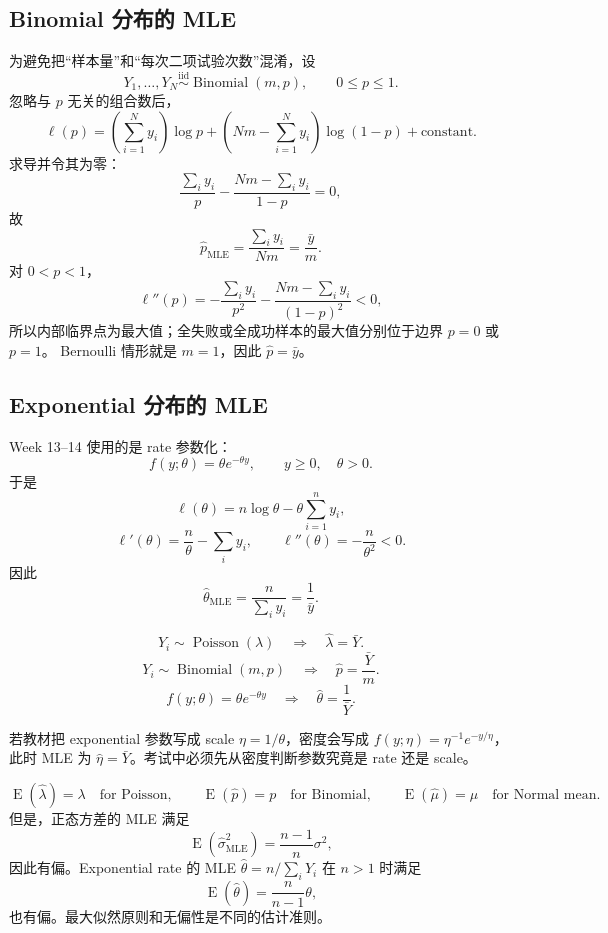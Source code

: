\documentclass[11pt,a4paper]{article}
\theoremstyle{definition}
\theoremstyle{plain}
\theoremstyle{remark}
\newcommand{\E}{\operatorname{E}}
\begin{document}
\subsection{Binomial 分布的 MLE}

为避免把“样本量”和“每次二项试验次数”混淆，设
\[
    Y_1,\ldots,Y_N\overset{\mathrm{iid}}{\sim}\operatorname{Binomial}(m,p),
    \qquad 0\le p\le 1.
\]
忽略与 $p$ 无关的组合数后，
\[
    \ell(p)
    =
    \left(\sum_{i=1}^N y_i\right)\log p
    +
    \left(Nm-\sum_{i=1}^N y_i\right)\log(1-p)
    +\text{constant}.
\]
求导并令其为零：
\[
    \frac{\sum_i y_i}{p}
    -
    \frac{Nm-\sum_i y_i}{1-p}
    =0,
\]
故
\[
    \hat p_{\mathrm{MLE}}
    =
    \frac{\sum_i y_i}{Nm}
    =
    \frac{\bar y}{m}.
\]
对 $0<p<1$，
\[
    \ell''(p)
    =
    -\frac{\sum_i y_i}{p^2}
    -
    \frac{Nm-\sum_i y_i}{(1-p)^2}
    <0,
\]
所以内部临界点为最大值；全失败或全成功样本的最大值分别位于边界 $p=0$ 或 $p=1$。
Bernoulli 情形就是 $m=1$，因此 $\hat p=\bar y$。

\subsection{Exponential 分布的 MLE}

Week 13--14 使用的是 rate 参数化：
\[
    f(y;\theta)=\theta e^{-\theta y},\qquad y\ge0,\quad\theta>0.
\]
于是
\[
    \ell(\theta)
    =
    n\log\theta-\theta\sum_{i=1}^n y_i,
\]
\[
    \ell'(\theta)=\frac{n}{\theta}-\sum_i y_i,\qquad
    \ell''(\theta)=-\frac{n}{\theta^2}<0.
\]
因此
\[
    \hat\theta_{\mathrm{MLE}}
    =
    \frac{n}{\sum_i y_i}
    =
    \frac{1}{\bar y}.
\]

\begin{memorybox}
\[
    \boxed{
    Y_i\sim\operatorname{Poisson}(\lambda)
    \quad\Longrightarrow\quad
    \hat\lambda=\bar Y.
    }
\]
\[
    \boxed{
    Y_i\sim\operatorname{Binomial}(m,p)
    \quad\Longrightarrow\quad
    \hat p=\frac{\bar Y}{m}.
    }
\]
\[
    \boxed{
    f(y;\theta)=\theta e^{-\theta y}
    \quad\Longrightarrow\quad
    \hat\theta=\frac{1}{\bar Y}.
    }
\]
\end{memorybox}

\begin{warnbox}
若教材把 exponential 参数写成 scale $\eta=1/\theta$，密度会写成
$f(y;\eta)=\eta^{-1}e^{-y/\eta}$，此时 MLE 为 $\hat\eta=\bar Y$。考试中必须先从密度判断参数究竟是 rate 还是 scale。
\end{warnbox}

\begin{keybox}
\[
\E(\hat\lambda)=\lambda
\quad\text{for Poisson},\qquad
\E(\hat p)=p
\quad\text{for Binomial},\qquad
\E(\hat\mu)=\mu
\quad\text{for Normal mean}.
\]
但是，正态方差的 MLE 满足
\[
    \E(\hat\sigma^2_{\mathrm{MLE}})
    =
    \frac{n-1}{n}\sigma^2,
\]
因此有偏。Exponential rate 的 MLE $\hat\theta=n/\sum_iY_i$ 在 $n>1$ 时满足
\[
    \E(\hat\theta)=\frac{n}{n-1}\theta,
\]
也有偏。最大似然原则和无偏性是不同的估计准则。
\end{keybox}
\end{document}
